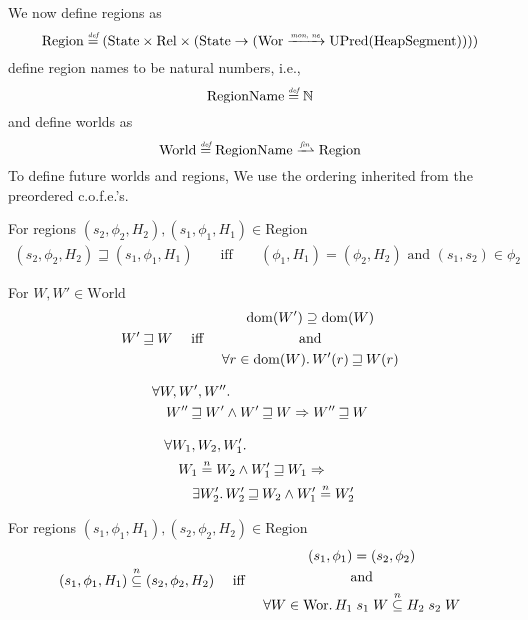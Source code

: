 \documentclass[a4paper]{article}
\newcommand{\finparfun}{\xrightharpoonup{\textit{\tiny{fin}}}}
\newcommand{\monnefun}{\xrightarrow{\textit{\tiny{mon, ne}}}}
\newcommand{\fun}{\rightarrow}
\newcommand{\defeq}{\stackrel{\textit{\tiny{def}}}{=}}
\newcommand{\nequal}[1][n]{\stackrel{\tiny{#1}}{=}}
\newcommand{\nsubeq}[1][n]{\stackrel{\tiny{#1}}{\subseteq}}
\DeclareMathOperator{\dom}{dom}
\newcommand{\cofe}{c.o.f.e.}
\newcommand{\cofes}{\cofe{}'s}
\newcommand{\future}{\mathbin{\sqsupseteq}}
\newcommand{\plaindom}[1]{\mathrm{#1}}
\newcommand{\HeapSegments}{\plaindom{HeapSegment}}
\newcommand{\nats}{\mathbb{N}}
\newcommand{\Rel}{\plaindom{Rel}}
\newcommand{\States}{\plaindom{State}}
\newcommand{\RegionNames}{\plaindom{RegionName}}
\newcommand{\Regions}{\plaindom{Region}}
\newcommand{\Worlds}{\plaindom{World}}
\newcommand{\Wor}{\plaindom{Wor}}
\newcommand{\UPred}[1]{\plaindom{UPred}(#1)}
\begin{document}
We now define regions as
\[
\Regions \defeq (\States \times \Rel \times (\States \fun (\Wor \monnefun \UPred{\HeapSegments})))
\]
define region names to be natural numbers, i.e.,
\[
  \RegionNames \defeq \nats 
\]
and define worlds as
\[
\Worlds \defeq \RegionNames \finparfun \Regions
\]
To define future worlds and regions, We use the ordering inherited from the preordered \cofes{}.
\begin{definition}
For regions $(s_2,\phi_2,H_2), (s_1,\phi_1,H_1) \in \Regions$
  \begin{align*}
 (s_2,\phi_2,H_2) \future (s_1,\phi_1,H_1) &&\text{ iff } & &
(\phi_1,H_1) = (\phi_2,H_2) \text{ and } (s_1,s_2) \in \phi_2
  \end{align*}
\end{definition}

\begin{definition}
  For $W, W' \in \Worlds$
 \begin{align*}
 W' \future W & & \text{ iff } & &
   \begin{gathered}
     \dom(W') \supseteq \dom(W)\\ 
     \text{ and } \\
     \forall r \in \dom(W) \ldotp W'(r) \future W(r)
   \end{gathered}
 \end{align*}
\end{definition}

\begin{lemma}
\label{lem:future-worlds-trans}
  \begin{align*}
    & \forall W, W', W'' \ldotp \\
    & \quad  W'' \future W' \land W' \future W \Rightarrow W'' \future W
  \end{align*}
\end{lemma}

\begin{lemma}
\label{lem:nequal-and-future-world}
  \begin{align*}
    & \forall W_1,W_2,W_1' \ldotp \\
    & \quad W_1 \nequal W_2 \land W_1' \future W_1 \Rightarrow \\
    & \qquad \exists W_2' \ldotp W_2' \future W_2 \land W_1' \nequal W_2'
  \end{align*}
\end{lemma}

\begin{definition}
For regions $(s_1,\phi_1,H_1), (s_2,\phi_2,H_2) \in \Regions$
\begin{align*}
  (s_1,\phi_1,H_1) \nsubeq (s_2,\phi_2,H_2) & & \text{ iff } & &
  \begin{gathered}
    (s_1,\phi_1) = (s_2,\phi_2)\\
    \text{ and }\\
    \forall W \in \Wor \ldotp H_1 \; s_1 \; W \nsubeq H_2 \; s_2 \; W
  \end{gathered}
\end{align*}
\end{definition}
\end{document}
